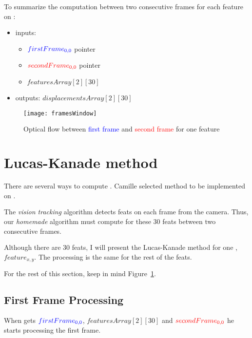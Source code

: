 To summarize the \flow{} computation between two consecutive frames for each feature on \vc:
\begin{itemize}
	\item inputs:
		\begin{itemize}
			\item $\textcolor{blue}{firstFrame_{0,0}}$ pointer
			\item $\textcolor{red}{secondFrame_{0,0}}$ pointer
			\item {} $featuresArray[2][30]$
		\end{itemize}
	\item outputs:  $displacementsArray[2][30]$
\end{itemize}

\begin{figure}[!htbp]
	\centering
	\texttt{[image: framesWindow]}
	\caption{Optical flow between \textcolor{blue}{first frame} and \textcolor{red}{second frame} for one feature}
	\label{framesWindowFig}
\end{figure}
\FloatBarrier


\section{Lucas-Kanade method}

There are several ways to compute \flow{}. Camille selected  method to be implemented on \vc.

The \emph{vision tracking} algorithm detects  feat{}s on each frame from the camera. Thus, our \emph{homemade} algorithm must compute \flow{} for these 30 feat{}s between two consecutive frames.

Although there are 30 feat{}s, I will present the Lucas-Kanade method for one \feat{}, $feature_{x,y}$. The processing is the same for the rest of the feat{}s.

For the rest of this section, keep in mind Figure~\ref{framesWindowFig}.

\subsection{First Frame Processing}

When \vc{} gets $\textcolor{blue}{firstFrame_{0,0}}$,  $featuresArray[2][30]$ and $\textcolor{red}{secondFrame_{0,0}}$ he starts processing the first frame.

